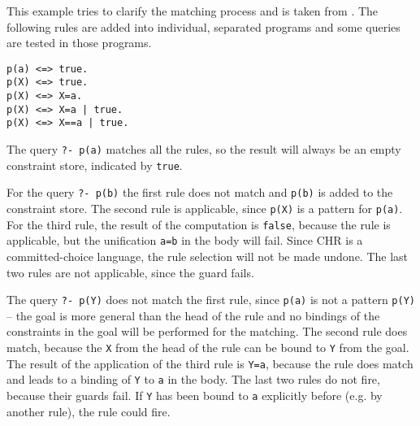 \begin{example}[Matching]
This example tries to clarify the matching process and is taken from \cite[12]{fru_chr_book_2009}. The following rules are added into individual, separated programs and some queries are tested in those programs.

\begin{lstlisting}
p(a) <=> true.
p(X) <=> true.
p(X) <=> X=a.
p(X) <=> X=a | true.
p(X) <=> X==a | true.
\end{lstlisting}

The query \lstinline|?- p(a)| matches all the rules, so the result will always be an empty constraint store, indicated by \lstinline|true|.

For the query \lstinline|?- p(b)| the first rule does not match and \lstinline|p(b)| is added to the constraint store. The second rule is applicable, since \lstinline|p(X)| is a pattern for \lstinline|p(a)|. For the third rule, the result of the computation is \lstinline|false|, because the rule is applicable, but the unification \lstinline|a=b| in the body will fail. Since CHR is a committed-choice language, the rule selection will not be made undone. The last two rules are not applicable, since the guard fails.

The query \lstinline|?- p(Y)| does not match the first rule, since \lstinline|p(a)| is not a pattern \lstinline|p(Y)| -- the goal is more general than the head of the rule and no bindings of the constraints in the goal will be performed for the matching. The second rule does match, because the \lstinline|X| from the head of the rule can be bound to \lstinline|Y| from the goal. The result of the application of the third rule is \lstinline|Y=a|, because the rule does match and leads to a binding of \lstinline|Y| to \lstinline|a| in the body. The last two rules do not fire, because their guards fail. If \lstinline|Y| has been bound to \lstinline|a| explicitly before (e.g. by another rule), the rule could fire.
\end{example}


